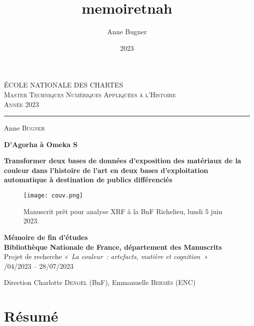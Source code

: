 \documentclass[a4paper,12pt, twoside]{book}
\author{Anne Bugner}
\title{memoiretnah}
\date{2023}
\begin{document}
\begin{titlepage}

\begin{center}

        ÉCOLE NATIONALE DES CHARTES\\
        \textsc{Master Techniques Numériques Appliquées à l'Histoire}\\
        \medskip
        \textsc{Année 2023}  

\begin{center}\rule{2cm}{0.02cm}\end{center}

\bigskip
\bigskip
\bigskip

Anne \textsc{Bugner}

\bigskip
\bigskip
\bigskip
\bigskip
\bigskip

\begin{Large}
\textcolor{greencode}{\textbf{D'Agorha à Omeka S}}\\    
\end{Large}
\bigskip
\bigskip
\begin{large}
    \textcolor{teal1}{\textbf{Transformer deux bases de données d’exposition des matériaux de la couleur dans l’histoire de l’art en deux bases d’exploitation automatique à destination de publics différenciés}}
\end{large}

\begin{figure}[!h]
    \centering
    \texttt{[image: couv.png]}
    \caption*{Manuscrit prêt pour analyse XRF à la BnF Richelieu, lundi 5 juin 2023.}
\end{figure}

\large\textbf{Mémoire de fin d'études}\\
\medskip
\textbf{Bibliothèque Nationale de France, département des Manuscrits}\\
Projet de recherche \textit{«~La couleur~: artefacts, matière et cognition~»}\\

/04/2023 – 28/07/2023

\vfill

Direction Charlotte \textsc{Denoël} (BnF), Emmanuelle \textsc{Bermès} (ENC)
\end{center}
\end{titlepage}

\frontmatter

\clearemptydoublepage
\chapter*{Résumé}
\end{document}

